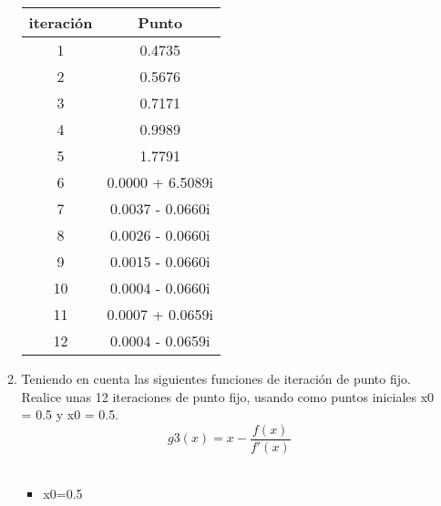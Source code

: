 \documentclass{udpreport}
\begin{document}
\begin{enumerate}
\begin{enumerate}
\begin{table}[H]
\begin{tabular} { |c|c|}
        \hline
        iteración  &  Punto\\
        \hline
        1 &  0.4735       \\
         \hline
        2 &   0.5676     \\
         \hline
        3 &  0.7171
       \\
         \hline
        4 &   0.9989     \\
         \hline
        5 & 1.7791        \\
         \hline
        6 &  0.0000 + 6.5089i      \\
         \hline
        7 &   0.0037 - 0.0660i       \\
         \hline
        8 &     0.0026 - 0.0660i   \\
         \hline
        9 &   0.0015 - 0.0660i       \\
         \hline
        10 &    0.0004 - 0.0660i      \\
         \hline
        11 &    0.0007 + 0.0659i \\
         \hline
        12 &   0.0004 - 0.0659i       \\
        \hline
        
        \end{tabular}
        
    \end{table}
 \vspace{3cm}   
 \item Teniendo en cuenta las siguientes funciones de iteración de punto fijo.  Realice unas 12 iteraciones de punto fijo, usando como puntos iniciales x0 = 0.5 y x0 = 0.5.\\   
 
 \begin{equation}
 g3(x) = x-\frac{f(x)}
{f'(x)}
\end{equation}
\\
 \begin{itemize}
\item x0=0.5
\end{itemize}

\begin{table}[H]
    \centering
        \begin{tabular} { |c|c|}
        

\end{tabular}
\end{table}
\end{enumerate}
\end{enumerate}
\end{document}
